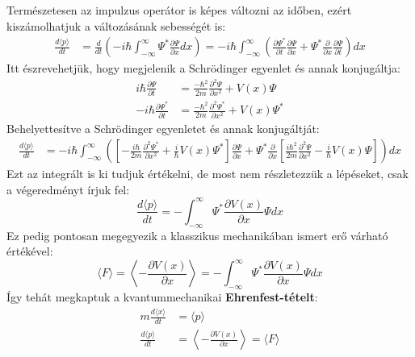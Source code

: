 \documentclass[../main.tex]{subfiles}
\begin{document}
Természetesen az impulzus operátor is képes változni az időben, ezért kiszámolhatjuk a változásának sebességét is:
\begin{equation}
    \begin{aligned}
        \frac{d \langle p \rangle}{dt} &= \frac{d}{dt} \left( -i \hbar \int_{-\infty}^{\infty} \Psi^* \frac{\partial \Psi}{\partial x} dx \right) = -i \hbar \int_{-\infty}^{\infty} \left( \frac{\partial \Psi^*}{\partial t} \frac{\partial \Psi}{\partial x} + \Psi^* \frac{\partial}{\partial x} \frac{\partial \Psi}{\partial t} \right) dx
    \end{aligned}
\end{equation}
Itt észrevehetjük, hogy megjelenik a Schrödinger egyenlet és annak konjugáltja:
\begin{equation}
    \begin{aligned}
        i\hbar \frac{\partial \Psi}{\partial t} &= \frac{-\hbar^2}{2m} \frac{\partial^2 \Psi}{\partial x^2} + V(x) \Psi \\
        -i\hbar \frac{\partial \Psi^*}{\partial t} &= \frac{-\hbar^2}{2m} \frac{\partial^2 \Psi^*}{\partial x^2} + V(x) \Psi^*
    \end{aligned}
\end{equation}
Behelyettesítve a Schrödinger egyenletet és annak konjugáltját:
\begin{equation}
    \begin{aligned}
        \frac{d \langle p \rangle}{dt} &= -i \hbar \int_{-\infty}^{\infty} \left( \left[ -\frac{i \hbar}{2m} \frac{\partial^2 \Psi^*}{\partial x^2} + \frac{i}{\hbar} V(x) \Psi^* \right] \frac{\partial \Psi}{\partial x} + \Psi^* \frac{\partial}{\partial x} \left[ \frac{i \hbar^2}{2m} \frac{\partial^2 \Psi}{\partial x^2} - \frac{i}{\hbar} V(x) \Psi \right] \right) dx
    \end{aligned}
\end{equation}
Ezt az integrált is ki tudjuk értékelni, de most nem részletezzük a lépéseket, csak a végeredményt írjuk fel:
\begin{equation}
    \frac{d \langle p \rangle}{dt} = -\int_{-\infty}^{\infty} \Psi^* \frac{\partial V(x)}{\partial x} \Psi dx
\end{equation}
Ez pedig pontosan megegyezik a klasszikus mechanikában ismert erő várható értékével:
\begin{equation}
    \langle F \rangle = \left\langle -\frac{\partial V(x)}{\partial x} \right\rangle = -\int_{-\infty}^{\infty} \Psi^* \frac{\partial V(x)}{\partial x} \Psi dx
\end{equation}
Így tehát megkaptuk a kvantummechanikai \textbf{Ehrenfest-tételt}:
\begin{equation}
    \boxed{
        \begin{aligned}
            m \frac{d \langle x \rangle}{dt} &= \langle p \rangle \\
            \frac{d \langle p \rangle}{dt} &= \left\langle -\frac{\partial V(x)}{\partial x} \right\rangle = \langle F \rangle
        \end{aligned}
    }
\end{equation}
\end{document}
